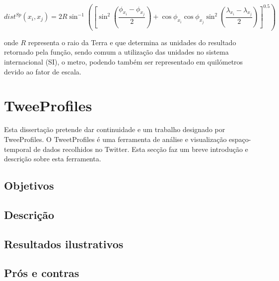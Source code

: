 \begin{equation}
dist^{Sp}( x_{i}, x_{j}) = 2R\sin^{-1}\left( \left[ \sin^{2}(\frac{\phi_{x_{i}}-\phi_{x_{j}}}{2})+\cos\phi_{x_{i}}\cos\phi_{x_{j}}\sin^{2}(\frac{\lambda_{x_{i}}-\lambda_{x_{j}}}{2})\right] ^{0.5}\right) 
\label{eq:hav} 
\end{equation}

onde $ R $ representa o raio da Terra e que determina as unidades do resultado retornado pela função, sendo comum a utilização das unidades no sistema internacional (SI), o metro, podendo também ser representado em quilómetros devido ao fator de escala. 






\section{TweeProfiles} \label{sec:tweep}

Esta dissertação pretende dar continuidade e um trabalho designado por TweeProfiles. O TweetProfiles é uma ferramenta de análise e visualização espaço-temporal de dados recolhidos no Twitter. Esta secção faz um breve introdução e descrição sobre esta ferramenta.

\subsection{Objetivos}



\subsection{Descrição}

\subsection{Resultados ilustrativos}

\subsection{Prós e contras}


